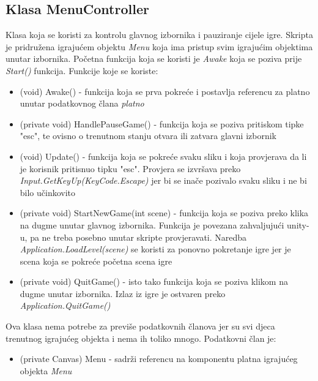 \subsection{Klasa MenuController}
Klasa koja se koristi za kontrolu glavnog izbornika i pauziranje cijele igre. Skripta je pridružena igrajućem objektu \emph{Menu} koja ima pristup svim igrajućim objektima unutar izbornika. Početna funkcija koja se koristi je \emph{Awake} koja se poziva prije \emph{Start()} funkcija. Funkcije koje se koriste:
\begin{itemize}
	\item (void) Awake() - funkcija koja se prva pokreće i postavlja referencu za platno unutar podatkovnog člana \emph{platno}
	\item (private void) HandlePauseGame() - funkcija koja se poziva pritiskom tipke "esc", te ovisno o trenutnom stanju otvara ili zatvara glavni izbornik
	\item (void) Update() - funkcija koja se pokreće svaku sliku i koja provjerava da li je korisnik pritisnuo tipku "esc". Provjera se izvršava preko \emph{Input.GetKeyUp(KeyCode.Escape)} jer bi se inače pozivalo svaku sliku i ne bi bilo učinkovito
	\item (private void) StartNewGame(int scene) - funkcija koja se poziva preko klika na dugme unutar glavnog izbornika. Funkcija je povezana zahvaljujući unity-u, pa ne treba posebno unutar skripte provjeravati. Naredba \emph{Application.LoadLevel(scene)} se koristi za ponovno pokretanje igre jer je scena koja se pokreće početna scena igre
	\item (private void) QuitGame() - isto tako funkcija koja se poziva klikom na dugme unutar izbornika. Izlaz iz igre je ostvaren preko \emph{Application.QuitGame()}
\end{itemize}
Ova klasa nema potrebe za previše podatkovnih članova jer su svi djeca trenutnog igrajućeg objekta i nema ih toliko mnogo. Podatkovni član je:
\begin{itemize}
	\item (private Canvas) Menu - sadrži referencu na komponentu platna igrajućeg objekta \emph{Menu}
\end{itemize}
\newpage
